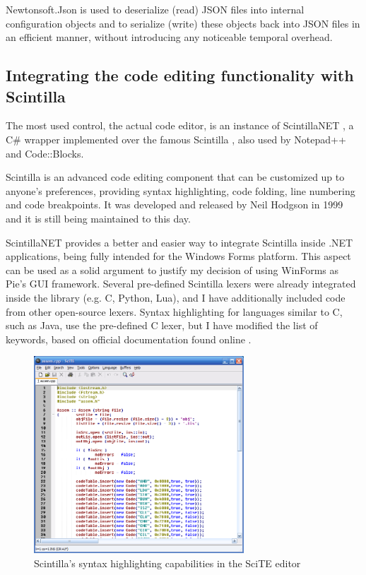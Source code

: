 Newtonsoft.Json is used to deserialize (read) JSON files into internal configuration objects and to serialize (write) these objects back into JSON files in an efficient manner, without introducing any noticeable temporal overhead.

\subsection{Integrating the code editing functionality with Scintilla}

The most used control, the actual code editor, is an instance of ScintillaNET \cite{scintillanet}, a C\# wrapper implemented over the famous Scintilla \cite{scintilla}, also used by Notepad++ and Code::Blocks.

Scintilla is an advanced code editing component that can be customized up to anyone's preferences, providing syntax highlighting, code folding, line numbering and code breakpoints. It was developed and released by Neil Hodgson in 1999 and it is still being maintained to this day. 

ScintillaNET provides a better and easier way to integrate Scintilla inside .NET applications, being fully intended for the Windows Forms platform. This aspect can be used as a solid argument to justify my decision of using WinForms as Pie's GUI framework. Several pre-defined Scintilla lexers were already integrated inside the library (e.g. C, Python, Lua), and I have additionally included code from other open-source lexers. Syntax highlighting for languages similar to C, such as Java, use the pre-defined C lexer, but I have modified the list of keywords, based on official documentation found online \cite{java-keywords}.

\begin{figure}[H]
\centering
\includegraphics[width=0.7\textwidth]{images/scite.png}
\caption{Scintilla's syntax highlighting capabilities in the SciTE editor}
\label{fig:fig2,1.}
\end{figure}

